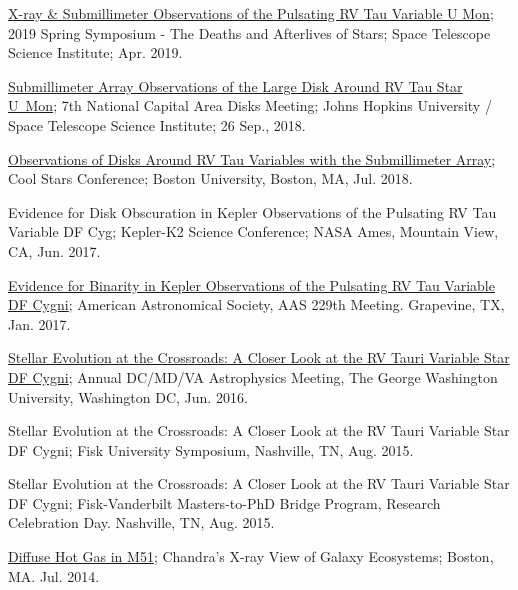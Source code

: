 \documentclass[12pt]{article}
\begin{document}
\begin{etaremune}
\item \href{http://www.stsci.edu/~ofox/posters2019/}{X-ray \& Submillimeter Observations of the Pulsating RV Tau Variable U Mon}; 2019 Spring Symposium - The Deaths and Afterlives of Stars; Space Telescope Science Institute; Apr. 2019.

\item \href{https://sites.google.com/view/ncad7-at-jhu/program?authuser=0}{Submillimeter Array Observations of the Large Disk Around RV Tau Star U~Mon}; 7th National Capital Area Disks Meeting; Johns Hopkins University / Space Telescope Science Institute; 26 Sep., 2018.

\item \href{http://coolstars20.cfa.harvard.edu/abstracts.html#posters}{Observations of Disks Around RV Tau Variables with the Submillimeter Array}; Cool Stars Conference; Boston University, Boston, MA, Jul. 2018.

\item Evidence for Disk Obscuration in Kepler Observations of the Pulsating RV Tau Variable DF Cyg; Kepler-K2 Science Conference; NASA Ames, Mountain View, CA, Jun. 2017.

\item \href{http://adsabs.harvard.edu/abs/2017AAS...22915210V}{Evidence for Binarity in Kepler Observations of the Pulsating RV Tau Variable DF Cygni}; American  Astronomical  Society,  AAS  229th  Meeting. Grapevine, TX, Jan. 2017.

\item \href{https://physics.columbian.gwu.edu/sites/g/files/zaxdzs1976/f/downloads/Astro2016_Conf_program_final.pdf}{Stellar  Evolution at the Crossroads: A Closer Look at the RV Tauri Variable Star DF Cygni};  Annual DC/MD/VA Astrophysics Meeting, The George Washington University, Washington DC, Jun. 2016.

\item Stellar Evolution at the Crossroads: A Closer Look at the RV Tauri Variable Star DF Cygni; Fisk University Symposium, Nashville, TN, Aug. 2015. 

\item Stellar Evolution at the Crossroads: A Closer Look at the RV Tauri Variable Star DF Cygni; Fisk-Vanderbilt Masters-to-PhD Bridge Program, Research Celebration Day. Nashville, TN, Aug. 2015. 

\item \href{http://adsabs.harvard.edu/abs/2014xvge.confE..38S}{Diffuse Hot Gas in M51}; Chandra’s X-ray View of Galaxy Ecosystems; 
Boston, MA. Jul. 2014.


\end{etaremune}
\end{document}
